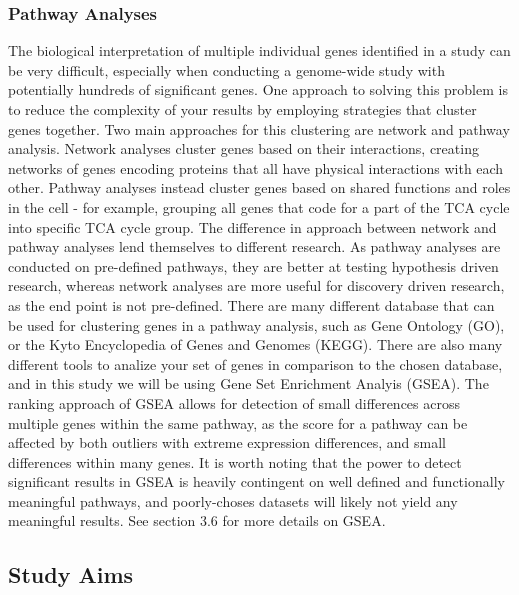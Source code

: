 \documentclass{article}
\begin{document}
\subsubsection{Pathway Analyses}
The biological interpretation of multiple individual genes identified in a study can be very difficult, especially when conducting a genome-wide study with potentially hundreds of significant genes. One approach to solving this problem is to reduce the complexity of your results by employing strategies that cluster genes together. Two main approaches for this clustering are network and pathway analysis. Network analyses cluster genes based on their interactions, creating networks of genes encoding proteins that all have physical interactions with each other\cite{Maayan2011IntroductionBiology}. Pathway analyses instead cluster genes based on shared functions and roles in the cell\cite{Garcia-Campos2015PathwayArt} - for example, grouping all genes that code for a part of the TCA cycle into specific TCA cycle group. The difference in approach between network and pathway analyses lend themselves to different research. As pathway analyses are conducted on pre-defined pathways, they are better at testing hypothesis driven research, whereas network analyses are more useful for discovery driven research, as the end point is not pre-defined.
There are many different database that can be used for clustering genes in a pathway analysis, such as Gene Ontology (GO)\cite{Ashburner2000GeneBiology}, or the Kyto Encyclopedia of Genes and Genomes (KEGG)\cite{Kanehisa2016KEGGAnnotation}. There are also many different tools to analize your set of genes in comparison to the chosen database, and in this study we will be using Gene Set Enrichment Analyis (GSEA)\cite{Subramanian2005GeneProfiles}. The ranking approach of GSEA allows for detection of small differences across multiple genes within the same pathway, as the score for a pathway can be affected by both outliers with extreme expression differences, and small differences within many genes. It is worth noting that the power to detect significant results in GSEA is heavily contingent on well defined and functionally meaningful pathways, and poorly-choses datasets will likely not yield any meaningful results. See section 3.6 for more details on GSEA.
\subsection{Study Aims}
\end{document}

